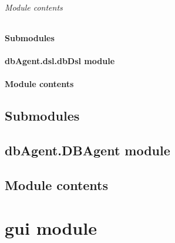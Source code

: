 \documentclass[letterpaper,10pt,english]{sphinxmanual}
\begin{document}

\begin{fulllineitems}
\label{dbAgent.dsl.req:dbAgent.dsl.req.csvHandle.writeDictCSV}
\end{fulllineitems}



\subparagraph{Module contents}
\label{dbAgent.dsl.req:module-contents}\label{dbAgent.dsl.req:module-dbAgent.dsl.req}

\subsubsection{Submodules}
\label{dbAgent.dsl:submodules}

\subsubsection{dbAgent.dsl.dbDsl module}
\label{dbAgent.dsl:dbagent-dsl-dbdsl-module}

\subsubsection{Module contents}
\label{dbAgent.dsl:module-contents}\label{dbAgent.dsl:module-dbAgent.dsl}

\section{Submodules}
\label{dbAgent:submodules}

\section{dbAgent.DBAgent module}
\label{dbAgent:dbagent-dbagent-module}

\section{Module contents}
\label{dbAgent:module-dbAgent}\label{dbAgent:module-contents}

\chapter{gui module}
\label{gui:gui-module}\label{gui:module-gui}\label{gui::doc}
\end{document}
